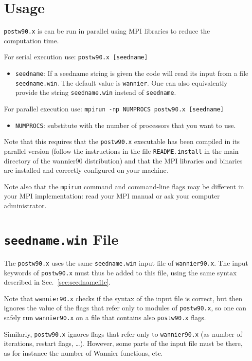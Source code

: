 \section{Usage}
{\tt postw90.x} is can be run in parallel using MPI libraries to
reduce the computation time.

For serial execution use: {\tt postw90.x [seedname]} 

\begin{itemize} \item 
{\tt seedname}: If a seedname string is given the code
will read its input from a file {\tt seedname.win}. The default
  value is {\tt wannier}. One can also equivalently provide the string
  {\tt seedname.win} instead of  {\tt seedname}.
\end{itemize}

For parallel execution use: {\tt mpirun -np NUMPROCS postw90.x [seedname]}

\begin{itemize} \item 
{\tt NUMPROCS}: substitute with the number of processors that you want
to use.
\end{itemize}

Note that this requires that the {\tt postw90.x} executable has been
compiled in its parallel version (follow the instructions in the file
{\tt README.install} in the main directory of the wannier90
distribution) and
that the MPI libraries and binaries are installed and correctly
configured on your machine.

Note also that the {\tt mpirun} command and command-line flags may be
different in your MPI implementation: read your MPI manual or ask your
computer administrator.


\section[seedname.win File]{{\tt seedname.win} File}
The \texttt{postw90.x} uses the same \texttt{seedname.win} input file
of \texttt{wannier90.x}. The input keywords of \texttt{postw90.x} must
thus be added to this file, using the same syntax described in
Sec.~\ref{sec:seednamefile}. 

Note that \texttt{wannier90.x} checks if the syntax of the input file
is correct, but then ignores the value of the flags that refer only to
modules of \texttt{postw90.x}, so one can safely run
\texttt{wannier90.x} on a file that contains also \texttt{postw90.x}
flags.

Similarly, \texttt{postw90.x} ignores flags that refer only to
\texttt{wannier90.x} (as number of iterations, restart flags,
\ldots). However, some parts of the input file must be there, as for
instance the number of Wannier functions, etc.

